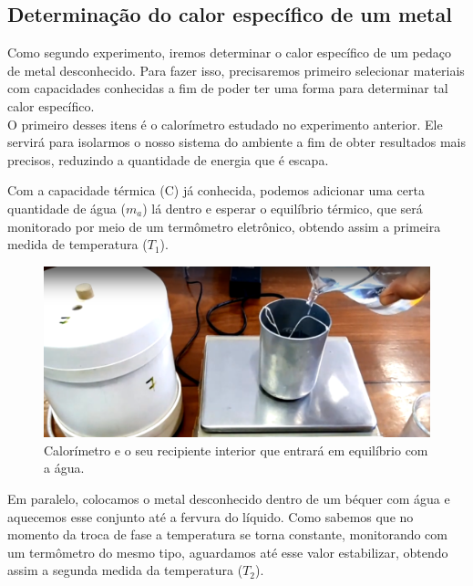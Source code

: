 \subsection{Determinação do calor específico de um metal}

Como segundo experimento, iremos determinar o calor específico de um pedaço de metal desconhecido. Para fazer isso, precisaremos primeiro selecionar materiais com capacidades conhecidas a fim de poder ter uma forma para determinar tal calor específico.\\

O primeiro desses itens é o calorímetro estudado no experimento anterior. Ele servirá para isolarmos o nosso sistema do ambiente a fim de obter resultados mais precisos, reduzindo a quantidade de energia que é escapa. 

Com a capacidade térmica (C) já conhecida, podemos adicionar uma certa quantidade de água ($m_a$) lá dentro e esperar o equilíbrio térmico, que será monitorado por meio de um termômetro eletrônico, obtendo assim a primeira medida de temperatura ($T_1$).

\begin{figure}[H]
  \centering
  \includegraphics[scale=0.4]{images/agua-equilibrio-calorimetro.png}
  \caption{Calorímetro e o seu recipiente interior que entrará em equilíbrio com a água.}
\end{figure}

Em paralelo, colocamos o metal desconhecido dentro de um béquer com água e aquecemos esse conjunto até a fervura do líquido. Como sabemos que no momento da troca de fase a temperatura se torna constante, monitorando com um termômetro do mesmo tipo, aguardamos até esse valor estabilizar, obtendo assim a segunda medida da temperatura ($T_2$).\\

